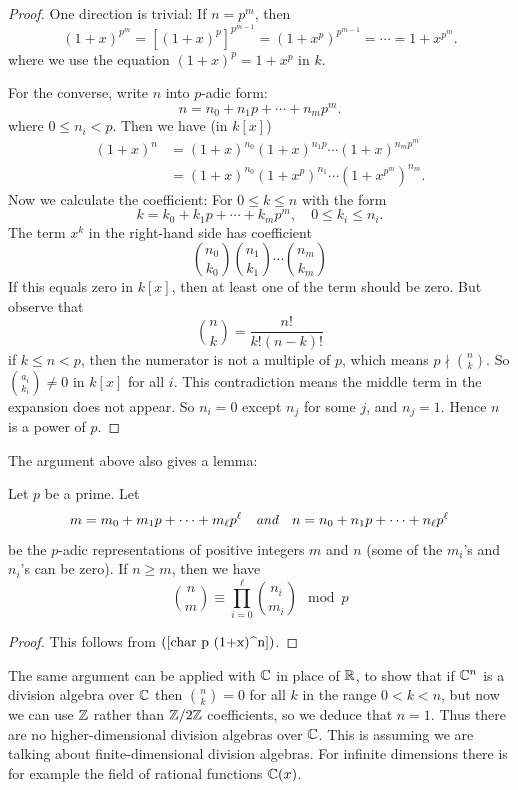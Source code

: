 \begin{proof}
One direction is trivial: If $n=p^m$, then
\[(1+x)^{p^m}=[(1+x)^p]^{p^{m-1}}=(1+x^p)^{p^{m-1}}=\cdots=1+x^{p^m}.\]
where we use the equation $(1+x)^p=1+x^p$ in $k$.\par
For the converse, write $n$ into $p$-adic form:
\[n=n_0+n_1p+\cdots+n_mp^m.\]
where $0\leq n_i<p$. Then we have (in $k[x]$)
\begin{equation}\label{char p (1+x)^n}
\begin{aligned}
(1+x)^n&=(1+x)^{n_0}(1+x)^{n_1p}\cdots(1+x)^{n_mp^m}\\
&=(1+x)^{n_0}(1+x^p)^{n_1}\cdots(1+x^{p^m})^{n_m}.
\end{aligned}
\end{equation}
Now we calculate the coefficient: For $0\leq k\leq n$ with the form
\[k=k_0+k_1p+\cdots+k_mp^m,\quad 0\leq k_i\leq n_i.\]
The term $x^k$ in the right-hand side has coefficient
\[\binom{n_0}{k_0}\binom{n_1}{k_1}\cdots\binom{n_m}{k_m}\]
If this equals zero in $k[x]$, then at least one of the term should be zero. But observe that
\[\binom{n}{k}=\frac{n!}{k!(n-k)!}\]
if $k\leq n<p$, then the numerator is not a multiple of $p$, which means $p\nmid \binom{n}{k}$. So $\binom{a_i}{k_i}\neq 0$ in $k[x]$ for all $i$. This contradiction 
means the middle term in the expansion does not appear. So $n_i=0$ except $n_j$ for some $j$, and $n_j=1$. Hence $n$ is a power of $p$.
\end{proof}
The argument above also gives a lemma:
\begin{lemma}
Let $p$ be a prime. Let 
\[m=m_0+m_1p+\cdots+m_\ell p^\ell\quad\textit{and}\quad n=n_0+n_1p+\cdots+n_\ell p^\ell\]
be the $p$-adic representations of positive integers $m$ and $n$ (some of the $m_i$'s and $n_i$'s can be zero). If $n\geq m$, then we have
\[\binom{n}{m}\equiv\prod_{i=0}^{\ell}\binom{n_i}{m_i}\mod p\]
\end{lemma}
\begin{proof}
This follows from $(\ref{char p (1+x)^n})$.
\end{proof}
\vspace{5mm}
The same argument can be applied with $\mathbb{C}$ in place of $\mathbb{R}$, to show that if $\mathbb{C}^n$ is a division algebra over $\mathbb{C}$ then $\binom{n}{k}=0$ for all $k$ in the range $0<k<n$, but now we can use $\mathbb{Z}$ rather than $\mathbb{Z}/2\mathbb{Z}$ coefficients, so we deduce that $n=1$. Thus there are no higher-dimensional division algebras over $\mathbb{C}$. This is assuming we are talking about finite-dimensional division algebras. For infinite dimensions there is for example the field of rational functions $\mathbb{C}(x)$.\par
